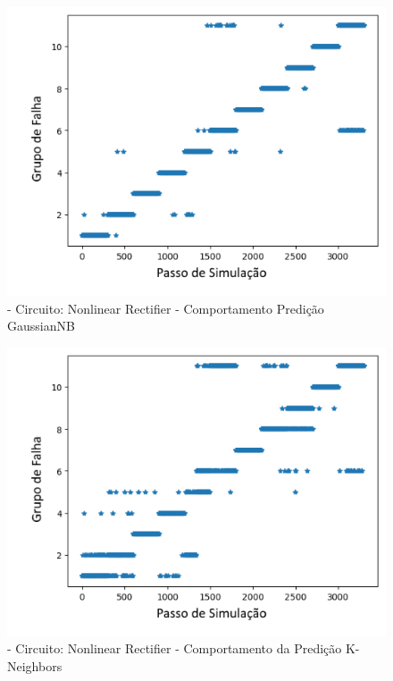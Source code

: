         \begin{figure}[H]
        \begin{center}
        \includegraphics[width=13cm]{./01_Pre_textuais/nonlin_figs/GaussianNB_Nonlinear_Rectfier_+_4bit_PRBS_[FALHA]_-_300_-_02sraw.png}
        \caption{\label{fig:DecisionTreeClassifieSalenkey}- Circuito: Nonlinear Rectifier - Comportamento Predição GaussianNB}
        \end{center}
        \end{figure}
        
        
        \begin{figure}[H]
        \begin{center}
        \includegraphics[width=13cm]{./01_Pre_textuais/nonlin_figs/KNeighborsClassifier_Nonlinear_Rectfier_+_4bit_PRBS_[FALHA]_-_300_-_02sraw.png}
        \caption{\label{fig:DecisionTreeClassifieSalenkey}- Circuito: Nonlinear Rectifier - Comportamento da Predição K-Neighbors }
        \end{center}
        \end{figure}
        
